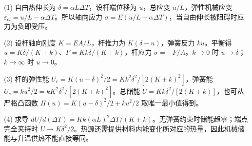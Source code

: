 (1) 自由热伸长为 \(\delta=\alpha L\Delta T\)，设杆端位移为 \(u\)，总应变 \(u/L\)，弹性机械应变 \(\varepsilon_{el}=u/L-\alpha\Delta T\)。所以轴向应力 \(\boxed{\sigma=E(u/L-\alpha\Delta T)}\)，当自由伸长被阻碍时应力为负即受压。

(2) 设杆轴向刚度 \(K=EA/L\)，杆推力为 \(K(\delta-u)\)，弹簧反力 \(ku\)。平衡得 \(\boxed{u=K\delta/(K+k)}\)、\(\boxed{F=Kk\delta/(K+k)}\)，杆应力 \(\sigma=-F/A\)。\(k\to0\) 时 \(u\to\delta\)；\(k\to\infty\) 时 \(u\to0\)。

(3) 杆的弹性能 \(U_r=K(u-\delta)^2/2=Kk^2\delta^2/[2(K+k)^2]\)，弹簧能 \(U_s=ku^2/2=kK^2\delta^2/[2(K+k)^2]\)。总储能 \(\boxed{U=Kk\delta^2/[2(K+k)]}\)，也可从严格凸函数 \(\Pi(u)=K(u-\delta)^2/2+ku^2/2\) 取唯一最小值得到。

(4) 求导 \(\boxed{dU/d(\Delta T)=Kk(\alpha L)^2\Delta T/(K+k)}\)。无弹簧约束时储能趋零；端点完全夹持时 \(U\to K\delta^2/2\)。热源还需提供材料内能变化所对应的热量，因此机械储能与升温供热不能直接等同。

